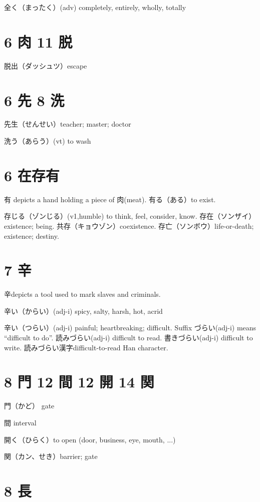 全く（まったく）(adv) completely, entirely, wholly, totally

\section{6 肉 11 脱}

脱出（ダッシュツ）escape

\section{6 先 8 洗}

先生（せんせい）teacher; master; doctor

洗う（あらう）(vt) to wash

\section{6 在存有}

有 depicts a hand holding a piece of 肉(meat).
有る（ある）to exist.

存じる（ゾンじる）(v1,humble) to think, feel, consider, know.
存在（ソンザイ）existence; being.
共存（キョウゾン）coexistence.
存亡（ソンボウ）life-or-death; existence; destiny.

\section{7 辛}

辛depicts a tool used to mark slaves and criminals.

辛い（からい）(adj-i) spicy, salty, harsh, hot, acrid

辛い（つらい）(adj-i) painful; heartbreaking; difficult.
Suffix づらい(adj-i) means ``difficult to do''.
読みづらい(adj-i) difficult to read.
書きづらい(adj-i) difficult to write.
読みづらい漢字difficult-to-read Han character.

\section{8 門 12 間 12 開 14 関}

門（かど） gate

間 interval

開く（ひらく）to open (door, business, eye, mouth, ...)

関（カン、せき）barrier; gate

\section{8 長}

